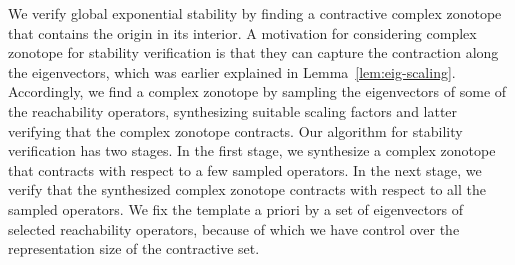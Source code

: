 We verify global exponential stability by finding a contractive
complex zonotope that contains the origin in its interior.  A
motivation for considering complex zonotope for stability verification
is that they can capture the contraction along the eigenvectors, which
was earlier explained in Lemma~\ref{lem:eig-scaling}.  Accordingly, we
find a complex zonotope by sampling the eigenvectors of some of the
reachability operators, synthesizing suitable scaling factors and
latter verifying that the complex zonotope contracts.  Our algorithm
for stability verification has two stages.  In the first stage, we
synthesize a complex zonotope that contracts with respect to a few
sampled operators.  In the next stage, we verify that the synthesized
complex zonotope contracts with respect to all the sampled operators.
We fix the template a priori by a set of eigenvectors of selected
reachability operators, because of which we have control over the
representation size of the contractive set.

